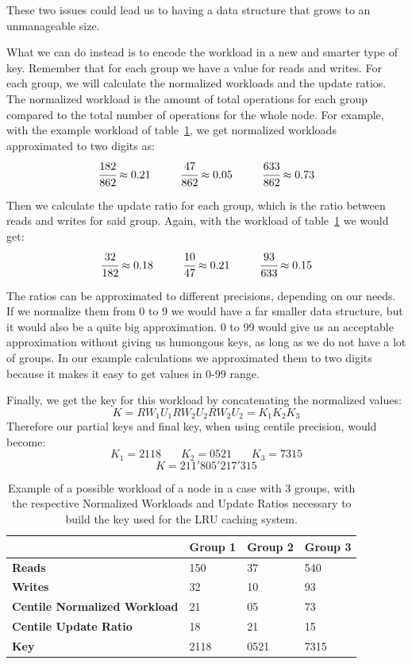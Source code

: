 These two issues could lead us to having a data structure that grows to an unmanageable size.

What we can do instead is to encode the workload in a new and smarter type of key. Remember that for each group we have a value for reads and writes. For each group, we will calculate the normalized workloads and the update ratios. The normalized workload is the amount of total operations for each group compared to the total number of operations for the whole node. For example, with the example workload of table~\ref{tab:workload-example}, we get normalized workloads approximated to two digits as: 
$$ \cfrac{182}{862} \approx 0.21\ \ \ \ \ \ \ \ \cfrac{47}{862} \approx 0.05\ \ \ \ \ \ \ \ \cfrac{633}{862} \approx 0.73$$

Then we calculate the update ratio for each group, which is the ratio between reads and writes for said group. Again, with the workload of table~\ref{tab:workload-example} we would get:
$$ \cfrac{32}{182} \approx 0.18\ \ \ \ \ \ \ \ \cfrac{10}{47} \approx 0.21\ \ \ \ \ \ \ \ \cfrac{93}{633} \approx 0.15$$

The ratios can be approximated to different precisions, depending on our needs. If we normalize them from 0 to 9 we would have a far smaller data structure, but it would also be a quite big approximation. 0 to 99 would give us an acceptable approximation without giving us humongous keys, as long as we do not have a lot of groups. In our example calculations we approximated them to two digits because it makes it easy to get values in 0-99 range.

Finally, we get the key for this workload by concatenating the normalized values:
$$ K = RW_1 U_1 RW_2 U_2 RW_2 U_2 = K_1 K_2 K_3 $$
Therefore our partial keys and final key, when using centile precision, would become:
$$ K_1 = 2118\ \ \ \ \ \ \ \ K_2 = 0521\ \ \ \ \ \ \ \ K_3 =7315 $$
$$ K = 211'805'217'315 $$

\begin{table}[!htb]
  \centering
  \begin{tabular}{l l l l}
    \hline
    & \textbf{Group 1} & \textbf{Group 2} & \textbf{Group 3} \\
    \hline
    \textbf{Reads} & 150 & 37 & 540 \\
    \textbf{Writes} & 32 & 10 & 93 \\
    \hline
    \textbf{Centile Normalized Workload} & 21 & 05 & 73 \\
    \textbf{Centile Update Ratio} & 18 & 21 & 15 \\
    \textbf{Key} & 2118 & 0521 & 7315 \\
  \end{tabular}
  \caption{Example of a possible workload of a node in a case with 3 groups, with the respective Normalized Workloads and Update Ratios necessary to build the key used for the LRU caching system.}\label{tab:workload-example}
\end{table}


